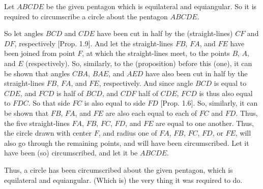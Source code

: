 \begin{Parallel}{}{}
{Let $ABCDE$ be the given pentagon  which is equilateral and equiangular.
So it is required to circumscribe a circle about the pentagon 
$ABCDE$.

\epsfysize=2.2in
\centerline{}

So let angles $BCD$ and $CDE$ have  been cut
in half by  the (straight-lines) $CF$ and $DF$, respectively [Prop. 1.9]. And let the straight-lines
$FB$, $FA$, and $FE$ have been joined from point $F$, at which the
straight-lines meet, to the points $B$, $A$, and $E$ (respectively).
So, similarly, to the (proposition) before this (one), it can be shown that
angles $CBA$, $BAE$, and $AED$ have also  been cut in half by
the straight-lines $FB$, $FA$, and $FE$, respectively. And since
angle $BCD$ is equal to $CDE$, and $FCD$ is half of $BCD$, and $CDF$ half
of $CDE$, $FCD$ is thus also equal to $FDC$. So that side $FC$ is also equal to
side $FD$ [Prop. 1.6]. So, similarly, it can be
shown that $FB$, $FA$, and $FE$ are also each equal to each of $FC$ and $FD$. 
Thus, the five straight-lines $FA$, $FB$, $FC$, $FD$, and $FE$ are equal to
one another. Thus, the circle drawn with center $F$, and radius one of
$FA$, $FB$, $FC$, $FD$, or $FE$, will also go through the remaining points, and
will have been circumscribed. Let it have been (so) circumscribed, and let
it be $ABCDE$.

Thus, a circle has been circumscribed about the given pentagon, which
is equilateral and equiangular. (Which is) the very thing it was required to
do.}
\end{Parallel}

